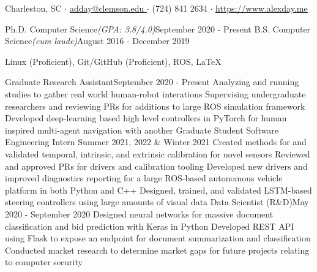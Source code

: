 \documentclass[letter]{article}
\begin{document}
    \vspace*{-40pt}

     {Charleston, SC $\cdot$ \href{mailto://adday@clemson.edu}{\underline{adday@clemson.edu }} $\cdot$ (724) 841 2634 $\cdot$ \href{https://www.alexday.me} {\underline{https://www.alexday.me}}}

         {Ph.D. Computer Science}{\textit{(GPA: 3.8/4.0)}}{September 2020 - Present}
        \vspace{\interspace}
         {B.S. Computer Science}{\textit{(cum laude)}}{August 2016 - December 2019}
        \vspace{\interspace}
    \vspace{-\interspace}



           {Linux (Proficient), Git/GitHub (Proficient), ROS, \LaTeX} 


        {Graduate Research Assistant}{September 2020 - Present}
        {Analyzing and running studies to gather real world human-robot interations}
        {Supervising undergraduate researchers and reviewing PRs for additions to large ROS simulation framework}
        {Developed deep-learning based high level controllers in PyTorch for human inspired multi-agent navigation with another Graduate Student}
\vspace{\interspace}
        {Software Engineering Intern}
        {Summer 2021, 2022 \& Winter 2021}
        {Created methods for and validated temporal, intrinsic, and extrinsic calibration for novel sensors}
        {Reviewed and approved PRs for drivers and calibration tooling}
        {Developed new drivers and improved diagnostics reporting for a large ROS-based autonomous vehicle platform in both Python and C++}
        {Designed, trained, and validated LSTM-based steering controllers using large amounts of visual data}
\vspace{\interspace}
        {Data Scientist (R\&D)}{May 2020 - September 2020}
        {Designed neural networks for massive document classification and bid prediction with Keras in Python}
        {Developed REST API using Flask to expose an endpoint for document summarization and classification}
        {Conducted market research to determine market gaps for future projects relating to computer security}
\vspace{\interspace}
\vspace{-\interspace}
\end{document}
